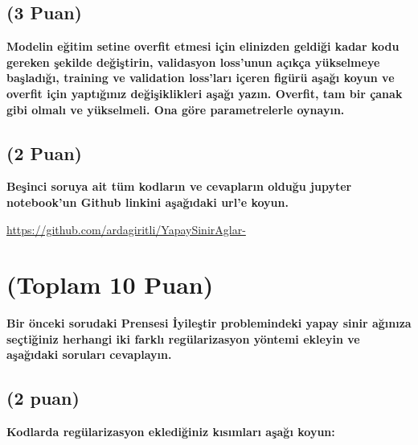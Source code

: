 \documentclass[11pt]{article}
\begin{document}
\begin{table}[ht!]
 
    \begin{tabular}{c|c}
     
    \end{tabular}
   
\end{table}

\subsection{(3 Puan)} \textbf{Modelin eğitim setine overfit etmesi için elinizden geldiği kadar kodu gereken şekilde değiştirin, validasyon loss'unun açıkça yükselmeye başladığı, training ve validation loss'ları içeren figürü aşağı koyun ve overfit için yaptığınız değişiklikleri aşağı yazın. Overfit, tam bir çanak gibi olmalı ve yükselmeli. Ona göre parametrelerle oynayın.}



\begin{comment}
\begin{figure}[ht!]
   
\end{figure}
\end{comment}

\subsection{(2 Puan)} \textbf{Beşinci soruya ait tüm kodların ve cevapların olduğu jupyter notebook'un Github linkini aşağıdaki url'e koyun.}

\url{https://github.com/ardagiritli/YapaySinirAglar-}

\section{(Toplam 10 Puan)} \textbf{Bir önceki sorudaki Prensesi İyileştir problemindeki yapay sinir ağınıza seçtiğiniz herhangi iki farklı regülarizasyon yöntemi ekleyin ve aşağıdaki soruları cevaplayın.} 

\subsection{(2 puan)} \textbf{Kodlarda regülarizasyon eklediğiniz kısımları aşağı koyun:} 

\begin{python}

\end{python}
\end{document}
